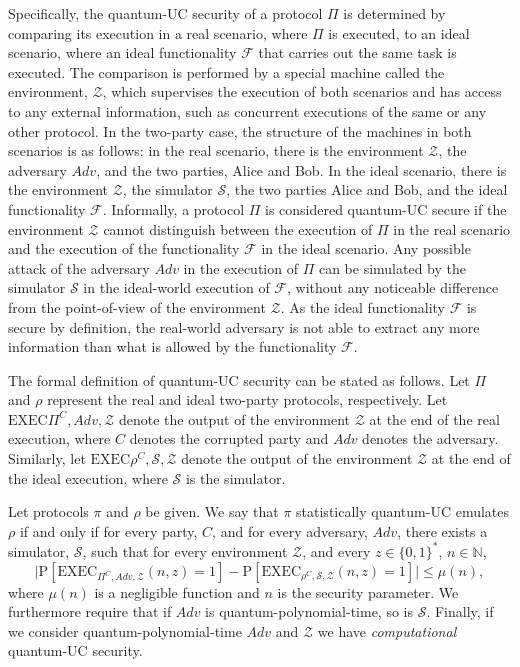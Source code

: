 Specifically, the quantum-UC security of a protocol $\Pi$ is determined by comparing its execution in a real scenario, where $\Pi$ is executed, to an ideal scenario, where an ideal functionality $\mathcal{F}$ that carries out the same task is executed. The comparison is performed by a special machine called the environment, $\mathcal{Z}$, which supervises the execution of both scenarios and has access to any external information, such as concurrent executions of the same or any other protocol. In the two-party case, the structure of the machines in both scenarios is as follows: in the real scenario, there is the environment $\mathcal{Z}$, the adversary $Adv$, and the two parties, Alice and Bob. In the ideal scenario, there is the environment $\mathcal{Z}$, the simulator $\mathcal{S}$, the two parties Alice and Bob, and the ideal functionality $\mathcal{F}$. Informally, a protocol $\Pi$ is considered quantum-UC secure if the environment $\mathcal{Z}$ cannot distinguish between the execution of $\Pi$ in the real scenario and the execution of the functionality $\mathcal{F}$ in the ideal scenario. Any possible attack of the adversary $Adv$ in the execution of $\Pi$ can be simulated by the simulator $\mathcal{S}$ in the ideal-world execution of $\mathcal{F}$, without any noticeable difference from the point-of-view of the environment $\mathcal{Z}$. As the ideal functionality $\mathcal{F}$ is secure by definition, the real-world adversary is not able to extract any more information than what is allowed by the functionality $\mathcal{F}$.

The formal definition of quantum-UC security can be stated as follows. Let $\Pi$ and $\rho$ represent the real and ideal two-party protocols, respectively. Let $\text{EXEC}{\Pi^C, Adv, \mathcal{Z}}$ denote the output of the environment $\mathcal{Z}$ at the end of the real execution, where $C$ denotes the corrupted party and $Adv$ denotes the adversary. Similarly, let $\text{EXEC}{\rho^C, \mathcal{S}, \mathcal{Z}}$ denote the output of the environment $\mathcal{Z}$ at the end of the ideal execution, where $\mathcal{S}$ is the simulator. 

\begin{definition}

Let protocols $\pi$ and $\rho$ be given. We say that $\pi$ statistically quantum-UC emulates $\rho$ if and only if for every party, $C$, and for every adversary, $Adv$, there exists a simulator, $\mathcal{S}$, such that for every environment $\mathcal{Z}$, and every $z\in\{0,1\}^*$, $n\in\mathbb{N}$,
\begin{equation*}
    \big|\text{P}[\text{EXEC}_{\Pi^C, Adv, \mathcal{Z}} (n, z) = 1] - \text{P}[\text{EXEC}_{\rho^C, \mathcal{S}, \mathcal{Z}}(n, z) = 1]\big| \leq \mu(n),
\end{equation*}
 where $\mu(n)$ is a negligible function and $n$ is the security parameter. We furthermore require that if $Adv$ is quantum-polynomial-time, so is $\mathcal{S}$. Finally, if we consider quantum-polynomial-time $Adv$ and $\mathcal{Z}$ we have \textit{computational} quantum-UC security.
\label{def:statisticalquc}
\end{definition}



